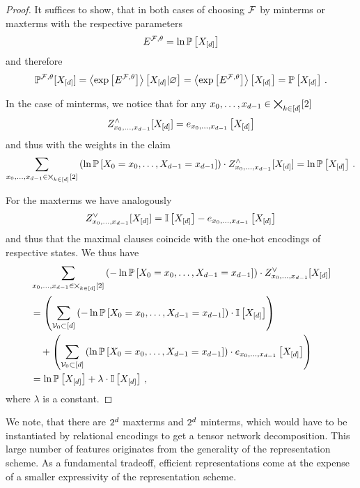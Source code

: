 \begin{proof}
	It suffices to show, that in both cases of choosing $\mathcal{F}$ by minterms or maxterms with the respective parameters
		\[ E^{\mathcal{F},\theta} =  \ln\mathbb{P}\left[X_{[d]}\right] \]
	and therefore
		\[ \mathbb{P}^{\mathcal{F},\theta}[X_{[d]}] 
		= \left\langle \mathrm{exp}\left[E^{\mathcal{F},\theta}\right]\right\rangle \left[ X_{[d]} | \varnothing \right] 
		=  \left\langle \mathrm{exp}\left[E^{\mathcal{F},\theta}\right]\right\rangle \left[ X_{[d]} \right] 
		= \mathbb{P}\left[X_{[d]}\right]\, . \]
	
	In the case of minterms, we notice that for any ${x_{0},\ldots,x_{d-1}}\in\bigtimes_{k\in[d]}[2]$
		\[ Z^{\land}_{{x_{0},\ldots,x_{d-1}}}[X_{[d]}] = e_{{x_{0},\ldots,x_{d-1}}}\left[X_{[d]}\right] \]
	and thus with the weights in the claim
		\[ \sum_{{x_{0},\ldots,x_{d-1}}\in\bigtimes_{k\in[d]}[2]} 
		\left( \ln \mathbb{P}\left[X_{0}=x_{0},\ldots,X_{d-1}=x_{d-1}\right] \right) \cdot Z^{\land}_{{x_{0},\ldots,x_{d-1}}}[X_{[d]}]
		= \ln\mathbb{P}\left[X_{[d]}\right] \, .
		 \]

	For the maxterms we have analogously
		\[ Z^{\lor}_{{x_{0},\ldots,x_{d-1}}}[X_{[d]}] = \mathbb{I}\left[X_{[d]}\right] - e_{x_{0},\ldots,x_{d-1}}\left[X_{[d]}\right] \]
	and thus that the maximal clauses coincide with the one-hot encodings of respective states.
	We thus have
	\begin{align*}
		& \sum_{{x_{0},\ldots,x_{d-1}}\in\bigtimes_{k\in[d]}[2]} 
		\left( - \ln \mathbb{P}\left[X_{0}=x_{0},\ldots,X_{d-1}=x_{d-1}\right] \right) \cdot Z^{\lor}_{{x_{0},\ldots,x_{d-1}}}[X_{[d]}] \\
		& =
		\left(  \sum_{\mathcal{V}_0\subset [d]} 
		\left( - \ln \mathbb{P}\left[X_{0}=x_{0},\ldots,X_{d-1}=x_{d-1}\right] \right) \cdot \mathbb{I}\left[X_{[d]}\right] \right) \\
		& \quad + 
		\left(  \sum_{\mathcal{V}_0\subset [d]} 
		\left(  \ln \mathbb{P}\left[X_{0}=x_{0},\ldots,X_{d-1}=x_{d-1}\right] \right) \cdot
		e_{x_{0},\ldots,x_{d-1}}\left[X_{[d]}\right] 
		\right) 
		 \\
		 & = \ln\mathbb{P}\left[X_{[d]}\right] + \lambda \cdot  \mathbb{I}\left[X_{[d]}\right]\,,
	\end{align*}
	where $\lambda$ is a constant.
\end{proof}

We note, that there are $2^{d}$ maxterms and $2^{d}$ minterms, which would have to be instantiated by relational encodings to get a tensor network decomposition.
This large number of features originates from the generality of the representation scheme.
As a fundamental tradeoff, efficient representations come at the expense of a smaller expressivity of the representation scheme.



